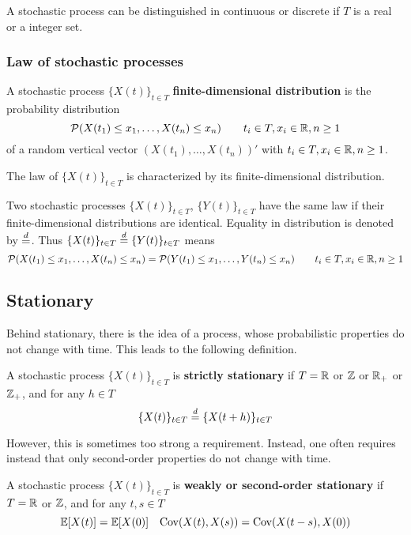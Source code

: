 A stochastic process can be distinguished in continuous or discrete if $T$ is a real or a integer set.

\subsubsection{Law of stochastic processes}
\begin{definition}
	A stochastic process $\{X(t)\}_{t \in T}$ \textbf{finite-dimensional distribution} is the probability distribution
	\begin{equation}
		\mathcal{P}(X(t_1) \le x_1, \dots, X(t_n) \le x_n) \qquad t_i \in T, x_i \in \mathbb{R}, n \ge 1
	\end{equation} 
	of a random vertical vector $(X(t_1), \dots, X(t_n))'$ with $t_i \in T, x_i \in \mathbb{R}, n \ge 1$. 
\end{definition}

The law of $\{X(t)\}_{t \in T}$ is characterized by its finite-dimensional distribution.

Two stochastic processes $\{X(t)\}_{t \in T}$, $\{Y(t)\}_{t \in T}$ have the same law if their finite-dimensional distributions are identical. Equality in distribution is denoted by $\overset{d}{=}$. Thus $\{X(t)\}_{t \in T} \overset{d}{=} \{Y(t)\}_{t \in T}$ means
\begin{equation}
	\mathcal{P}(X(t_1) \le x_1, \dots, X(t_n) \le x_n) = \mathcal{P}(Y(t_1) \le x_1, \dots, Y(t_n) \le x_n) \qquad t_i \in T, x_i \in \mathbb{R}, n \ge 1
\end{equation} 

\subsection{Stationary}
Behind stationary, there is the idea of a process, whose probabilistic properties do not change with time. This leads to the following definition.
\begin{definition}\label{def:strictstationary} 
	A stochastic process $\{X (t)\}_{t \in T}$ is \textbf{strictly stationary} if $T = \mathbb{R}$ or $\mathbb{Z}$ or $\mathbb{R}_+$ or $\mathbb{Z}_+$, and for any $h \in T$
	\begin{equation}
		\{X(t)\}_{t \in T} \overset{d}{=} \{X(t + h)\}_{t \in T} 
	\end{equation}
\end{definition}

However, this is sometimes too strong a requirement. Instead, one often requires instead that only second-order properties do not change with time.
\begin{definition}
	A stochastic process $\{X (t)\}_{t \in T}$ is \textbf{weakly or second-order stationary} if $T = \mathbb{R}$ or $\mathbb{Z}$, and for any $t, s \in T$
	\begin{equation}
		\mathbb{E}[X(t)] = \mathbb{E}[X(0)] \quad \textnormal{Cov}(X(t), X(s)) = \textnormal{Cov}(X(t-s), X(0))
	\end{equation}
\end{definition}

